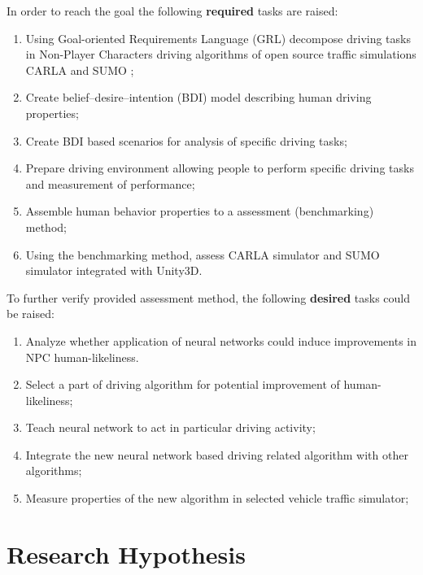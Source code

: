 \documentclass{VUMIFPS-master-intro}
\begin{document}
In order to reach the goal the following \textbf{required} tasks are raised:
\begin{enumerate}
	\item Using Goal-oriented Requirements Language (GRL) decompose driving tasks in Non-Player Characters driving algorithms of open source traffic simulations CARLA \cite{Dosovitskiy2017} and SUMO \cite{Biurrun2017};
	\item Create belief–desire–intention (BDI) model describing human driving properties;
	\item Create BDI based scenarios for analysis of specific driving tasks;
	\item Prepare driving environment allowing people to perform specific driving tasks and measurement of performance;
	\item Assemble human behavior properties to a assessment (benchmarking) method;
	\item Using the benchmarking method, assess CARLA simulator and SUMO simulator integrated with Unity3D.
\end{enumerate}

To further verify provided assessment method, the following \textbf{desired} tasks could be raised:
\begin{enumerate}
	\item Analyze whether application of neural networks could induce improvements in NPC human-likeliness.
	\item Select a part of driving algorithm for potential improvement of human-likeliness;
	\item Teach neural network to act in particular driving activity;
	\item Integrate the new neural network based driving related algorithm with other algorithms;
	\item Measure properties of the new algorithm in selected vehicle traffic simulator;
\end{enumerate}


\section{Research Hypothesis}
\end{document}
